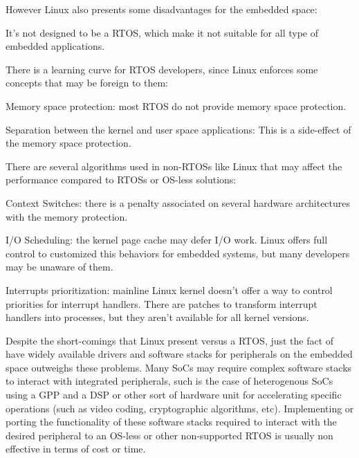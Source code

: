 However Linux also presents some disadvantages for the embedded space:
\begin{itemize*}
\item It's not designed to be a \ac{RTOS}, which make it not suitable for all type of embedded applications.
\item There is a learning curve for \ac{RTOS} developers, since Linux enforces some concepts that may be foreign to them:
	\begin{itemize*}
	\item Memory space protection: most \ac{RTOS} do not provide memory space protection.
	\item Separation between the kernel and user space applications: This is a side-effect of the memory space protection.
	\end{itemize*}
\item There are several algorithms used in non-\acp{RTOS} like Linux that may affect the performance compared to \acp{RTOS} or \ac{OS}-less solutions:
	\begin{itemize*}
	\item Context Switches: there is a penalty associated on several hardware architectures with the memory protection.
	\item I/O Scheduling: the kernel page cache may defer I/O work. Linux offers full control to customized this behaviors for embedded systems, but many developers may be unaware of them.
	\item Interrupts prioritization: mainline Linux kernel doesn't offer a way to control priorities for interrupt handlers. There are patches to transform interrupt handlers into processes, but they aren't available for all kernel versions.
	\end{itemize*}
\end{itemize*}

Despite the short-comings that Linux present versus a \ac{RTOS}, just the fact of have widely available drivers and software stacks for peripherals on the embedded space outweighs these problems. Many \acp{SoC} may require complex software stacks to interact with integrated peripherals, such is the case of heterogenous \acp{SoC} using a \ac{GPP} and a \ac{DSP} or other sort of hardware unit for accelerating specific operations (such as video coding, cryptographic algorithms, etc). Implementing or porting the functionality of these software stacks required to interact with the desired peripheral to an \ac{OS}-less or other non-supported \ac{RTOS} is usually non effective in terms of cost or time.

